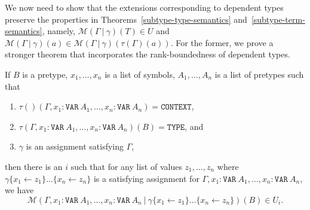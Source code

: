 \documentclass [12pt,twoside]{cslreport}
\newcommand{\tauGamma}[1]{\tau(\Gamma)(#1)}
\newcommand{\Mgamma}[1]{{\mathcal M}(\Gamma\vbar\gamma)(#1)}
\newcommand{\tttype}{\mathtt{TYPE}}
\newcommand{\ttcontext}{\mathtt{CONTEXT}}
\newcommand{\ttvar}{\mathtt{VAR}}
\newcommand{\vbar}{\ |\ }
\begin{document}
We now need to show that the extensions corresponding to dependent types
preserve the properties in Theorems~\ref{subtype-type-semantics}
and~\ref{subtype-term-semantics}, namely, 
$\Mgamma{T} \in U$ and $\Mgamma{a}\in \Mgamma{\tauGamma{a}}$\@.
For the former, we prove a stronger theorem that incorporates the
rank-boundedness of dependent types.
\begin{theorem}\label{dependent-type-semantics}
If $B$ is a pretype, $x_1,\ldots, x_n$ is a list of symbols,
$A_1,\ldots, A_n$ is a list of pretypes such that  
\begin{enumerate}
\item $\tau()(\Gamma, x_1:\ttvar~A_1, \ldots, x_n:\ttvar~A_n) = \ttcontext$,
\item $\tau(\Gamma, x_1:\ttvar~A_1, \ldots, x_n:\ttvar~A_n)(B) = \tttype$,
and
\item $\gamma$ is an assignment satisfying $\Gamma$,
\end{enumerate}
then
there is an $i$ such that for any list of values
$z_1,\ldots, z_n$ where $\gamma\{x_1\gets
z_1\}\ldots\{x_n\gets z_n\}$ is a satisfying assignment for
$\Gamma, x_1:\ttvar~A_1, \ldots, x_n:\ttvar~A_n$,  we have
$$\mathcal{M}(\Gamma, x_1:\ttvar~A_1, \ldots, x_n:\ttvar~A_n\vbar
\gamma\{x_1\gets z_1\}\ldots\{x_n\gets z_n\})(B) \in U_i.$$
\end{theorem}
\end{document}
